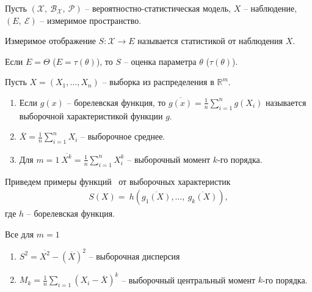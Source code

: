 Пусть $\displaystyle (\mathcal{X},\ \mathcal{B}_{\mathcal{X}},\ \mathcal{P})$ -- вероятностно-статистическая модель, $\displaystyle X$ -- наблюдение, $\displaystyle ( E,\ \mathcal{E})$ -- измеримое пространство.
\begin{definition}
Измеримое отображение $\displaystyle S:\mathcal{X}\rightarrow E$ называется статистикой от наблюдения $\displaystyle X$.
\end{definition}
\begin{definition}
Если $\displaystyle E=\Theta $ ($\displaystyle E=\tau ( \theta )$), то $\displaystyle S$ -- оценка параметра $\displaystyle \theta $ ($\displaystyle \tau ( \theta )$).
\end{definition}
\begin{example}
Пусть $\displaystyle X=( X_{1} ,\dotsc ,X_{n})$ -- выборка из распределения в $\displaystyle \mathbb{R}^{m}$.
\begin{enumerate}
    \item Если $\displaystyle g( x)$ -- борелевская функция, то $\displaystyle \overline{g( x)} =\frac{1}{n}\sum _{i=1}^{n} g( X_{i})$ называется выборочной характеристикой функции $\displaystyle g$.
    
    \item $\displaystyle \overline{X} =\frac{1}{n}\sum _{i=1}^{n} X_{i}$ -- выборочное среднее.
    
    \item Для $\displaystyle m=1\ \overline{X^{k}} =\frac{1}{n}\sum _{i=1}^{n} X_{i}^{k}$ -- выборочный момент $\displaystyle k$-го порядка.
\end{enumerate}
\end{example}
Приведем примеры функций \ от выборочных характеристик 
\begin{gather*}
    S( X) =\ h\left(\overline{g_{1}( X)} ,\dotsc,\ \overline{g_{k}( X)}\right),
\end{gather*}
где $h$ -- борелевская функция.
\begin{example}
Все для $\displaystyle m=1$
\begin{enumerate}
    \item $\displaystyle S^{2} =\overline{X^{2}} -(\overline{X})^{2}$ -- выборочная дисперсия
    
    \item $\displaystyle M_{k} =\frac{1}{n}\sum _{i=1}( X_{i} -\overline{X})^{k}$ -- выборочный центральный момент $\displaystyle k$-го порядка.
\end{enumerate}
\end{example}

